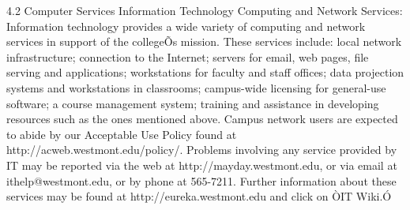\documentclass[letterpaper, 11pt]{article}
\begin{document}
	4.2 Computer Services
	Information Technology Computing and Network Services:  Information technology provides a wide variety of computing and network services in support of the collegeÕs mission.  These services include:  local network infrastructure; connection to the Internet; servers for email, web pages, file serving and applications; workstations for faculty and staff offices; data projection systems and workstations in classrooms; campus-wide licensing for general-use software; a course management system; training and assistance in developing resources such as the ones mentioned above.
	Campus network users are expected to abide by our Acceptable Use Policy found at http://acweb.westmont.edu/policy/.  Problems involving any service provided by IT may be reported via the web at http://mayday.westmont.edu, or via email at ithelp@westmont.edu, or by phone at 565-7211.  Further information about these services may be found at http://eureka.westmont.edu and click on ÒIT Wiki.Ó
\end{document}
